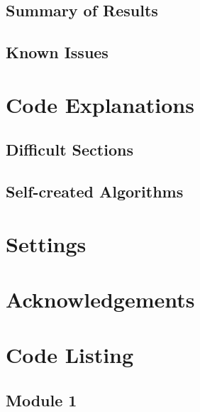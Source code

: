 \subsection{Summary of Results}

\subsection{Known Issues}

\section{Code Explanations}

\subsection{Difficult Sections}

\subsection{Self-created Algorithms}

\section{Settings}

\section{Acknowledgements}

\section{Code Listing}
\begin{landscape}
\subsection{Module 1}
\begin{comment}
\pythonfile[firstline=5]{./tex/function_programs/print_function.py}
\end{comment}
\end{landscape}
